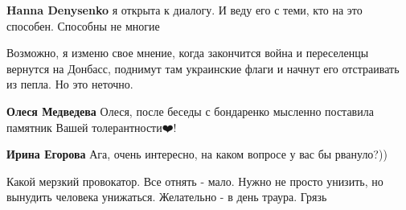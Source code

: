 \begin{itemize}
\begin{itemize}
 
\textbf{Hanna Denysenko} я открыта к диалогу. И веду его с теми, кто на это способен. Способны не многие

 

Возможно, я изменю свое мнение, когда закончится война и переселенцы вернутся
на Донбасс, поднимут там украинские флаги и начнут его отстраивать из пепла. Но
это неточно.

 
\textbf{Олеся Медведева} Олеся, после беседы с бондаренко мысленно поставила памятник Вашей толерантности❤️!

 
\textbf{Ирина Егорова} Ага, очень интересно, на каком вопросе у вас бы рвануло?))

 
Какой мерзкий провокатор. Все отнять - мало. Нужно не просто унизить, но
вынудить человека унижаться. Желательно - в день траура. Грязь

 

\end{itemize}
\end{itemize}
